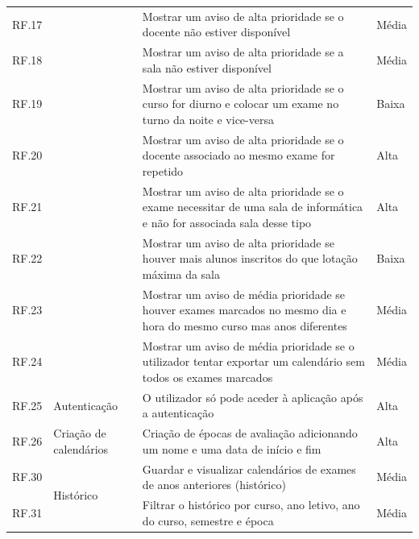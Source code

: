 \documentclass[12pt, twoside]{report}
\begin{document}
\begin{center}
\begin{longtable}{|m{1cm}|m{2.2cm}|m{10cm}|m{2cm}|}
			RF.17 && Mostrar um aviso de alta prioridade se o docente não estiver disponível & Média \\
			
			RF.18 && Mostrar um aviso de alta prioridade se a sala não estiver disponível & Média\\
			
			RF.19 && Mostrar um aviso de alta prioridade se o curso for diurno e colocar um exame no turno da noite e vice-versa & Baixa\\
			
			RF.20&&Mostrar um aviso de alta prioridade se o docente associado ao mesmo exame for repetido & Alta \\
			
			RF.21 && Mostrar um aviso de alta prioridade se o exame necessitar de uma sala de informática e não for associada sala desse tipo & Alta\\
			
			RF.22 && Mostrar um aviso de alta prioridade se houver mais alunos inscritos do que  lotação máxima da sala & Baixa\\
			
			RF.23 && Mostrar um aviso de média prioridade se houver exames marcados no mesmo dia e hora do mesmo curso mas anos diferentes & Média\\
			
			RF.24 && Mostrar um aviso de média prioridade se o utilizador tentar exportar um calendário sem todos os exames marcados & Média\\
			
			\hline
			
			RF.25 &Autenticação& O utilizador só pode aceder à aplicação após a autenticação & Alta\\
			\hline
			
			RF.26 &\multirow{1}{2cm}{Criação de calendários}& Criação de épocas de avaliação adicionando um nome e uma data de início e fim & Alta \\
	
			\hline
			RF.30 &\multirow{2}{*}{Histórico}& Guardar e visualizar calendários de exames de anos anteriores (histórico)& Média \\
			
			RF.31 && Filtrar o histórico por curso, ano letivo, ano do curso, semestre e época& Média \\
			\hline
		\end{longtable}
	\end{center}
\end{document}

